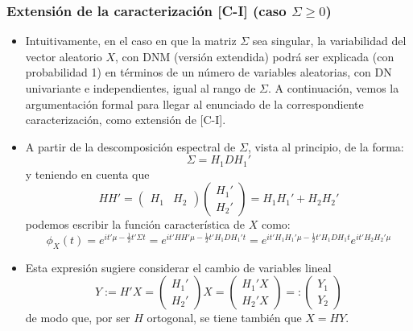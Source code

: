 \documentclass[11pt,a4paper]{article}
\begin{document}
\subsubsection{Extensión de la caracterización [C-I] (caso \texorpdfstring{$\Sigma \geq 0$}))}
\begin{itemize}
\item Intuitivamente, en el caso en que la matriz $\Sigma$ sea singular, la variabilidad del vector aleatorio $X$, con DNM (versión extendida) podrá ser explicada (con probabilidad 1) en términos de un número de variables aleatorias, con DN univariante e independientes, igual al rango de $\Sigma$. A continuación, vemos la argumentación formal para llegar al enunciado de la correspondiente caracterización, como extensión de [C-I].

\item A partir de la descomposición espectral de $\Sigma$, vista al principio, de la forma:
$$\Sigma = H_{1}DH_{1}'$$
y teniendo en cuenta que
$$HH' = \begin{pmatrix} H_{1} & H_{2} \end{pmatrix} \begin{pmatrix} H_{1}' \\ H_{2}' \end{pmatrix} = H_{1}H_{1}' + H_{2}H_{2}'$$
podemos escribir la función característica de $X$ como:
$$\phi_{X}(t) = e^{it'\mu - \frac{1}{2}t'\Sigma t} = e^{it'HH'\mu - \frac{1}{2}t'H_{1}DH_{1}'t} = e^{it'H_{1}H_{1}'\mu - \frac{1}{2}t'H_{1}DH_{1}t}e^{it'H_{2}H_{2}'\mu}$$

\item Esta expresión sugiere considerar el cambio de variables lineal
$$Y := H'X = \begin{pmatrix} H_{1}' \\ H_{2}' \end{pmatrix} X = \begin{pmatrix} H_{1}'X \\ H_{2}'X \end{pmatrix} =: \begin{pmatrix} Y_{1} \\ Y_{2} \end{pmatrix}$$
de modo que, por ser $H$ ortogonal, se tiene también que $X = HY$.


\end{itemize}
\end{document}

